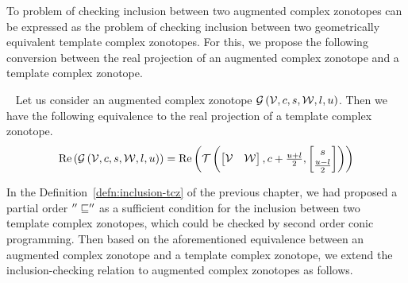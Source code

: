 %
To problem of checking inclusion between two augmented complex
zonotopes can be expressed as the problem of checking
inclusion between two geometrically equivalent template complex
zonotopes.  For this, we propose the following conversion between the
real projection of an augmented complex zonotope and a template
complex zonotope.
%
\begin{lemma}~\label{lem:acz-tcz-conversion}
Let us consider an augmented complex zonotope
$\mathcal{G}\left(\mathcal{V},c,s,\mathcal{W},l,u\right)$.  Then we have the
following equivalence to the real projection of a template complex zonotope.
%
\begin{align*}
  \operatorname{Re}\left(\mathcal{G}\left(\mathcal{V},c,s,\mathcal{W},l,u\right)\right)
  = \operatorname{Re}\left(\mathit{\operatorname{\mathcal{T}}}\left(\left[\begin{matrix}
      \mathcal{V} &
      \mathcal{W}
    \end{matrix}\right]
  ,\begin{matrix}
      c+\frac{u+l}{2}
    \end{matrix}
  ,\left[\begin{matrix}
      s\\
      \frac{u-l}{2}
    \end{matrix}\right]
  \right)
  \right)
\end{align*}
%
\end{lemma}
%
 In the Definition~\ref{defn:inclusion-tcz} of the previous chapter,
 we had proposed a partial order $''\sqsubseteq''$ as a sufficient
 condition for the inclusion between two
 template complex zonotopes, which could be checked by second order
 conic programming.  Then based on the aforementioned
 equivalence between an augmented complex zonotope and a template complex
 zonotope, we extend the inclusion-checking relation to augmented
 complex zonotopes as follows.
%
